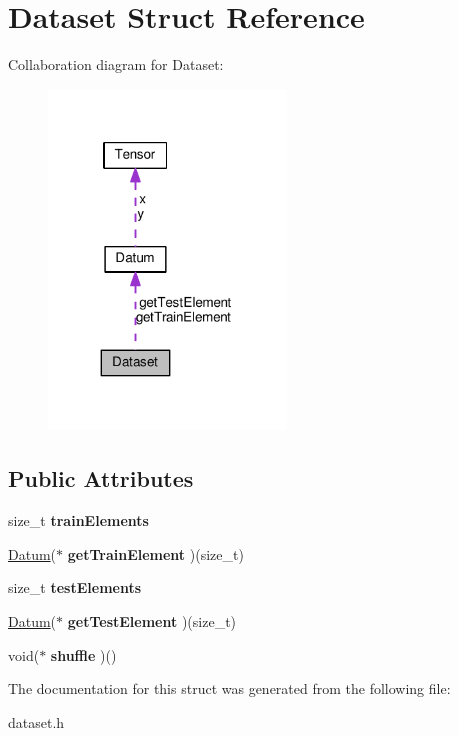 \hypertarget{structDataset}{}\section{Dataset Struct Reference}
\label{structDataset}


Collaboration diagram for Dataset\+:
\nopagebreak
\begin{figure}[H]
\begin{center}
\leavevmode
\includegraphics[width=179pt]{structDataset__coll__graph}
\end{center}
\end{figure}
\subsection*{Public Attributes}
\begin{DoxyCompactItemize}
\item 
size\+\_\+t {\bfseries train\+Elements}\hypertarget{structDataset_a0eb16d341ffee1ffd7bf831d4676251f}{}\label{structDataset_a0eb16d341ffee1ffd7bf831d4676251f}

\item 
\hyperlink{structDatum}{Datum}($\ast$ {\bfseries get\+Train\+Element} )(size\+\_\+t)\hypertarget{structDataset_ad56275ffce4161b71f63b319e92da258}{}\label{structDataset_ad56275ffce4161b71f63b319e92da258}

\item 
size\+\_\+t {\bfseries test\+Elements}\hypertarget{structDataset_aeef72e19c9615218257d0f243a0cee0c}{}\label{structDataset_aeef72e19c9615218257d0f243a0cee0c}

\item 
\hyperlink{structDatum}{Datum}($\ast$ {\bfseries get\+Test\+Element} )(size\+\_\+t)\hypertarget{structDataset_a76a75f489d541ab4dba3fd3c9e201b27}{}\label{structDataset_a76a75f489d541ab4dba3fd3c9e201b27}

\item 
void($\ast$ {\bfseries shuffle} )()\hypertarget{structDataset_a1d4de9bcd0037a298f992aee2864fb6d}{}\label{structDataset_a1d4de9bcd0037a298f992aee2864fb6d}

\end{DoxyCompactItemize}


The documentation for this struct was generated from the following file\+:\begin{DoxyCompactItemize}
\item 
dataset.\+h\end{DoxyCompactItemize}
